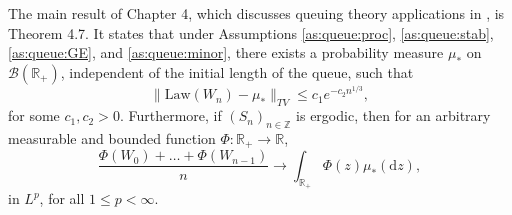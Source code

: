 \documentclass[a4paper,10pt]{article}
\newcommand{\Z}{\mathbb{Z}}
\newcommand{\R}{\mathbb{R}}
\newcommand{\law}[1]{\text{Law}(#1)}
\newcommand{\dint}{\mathrm{d}}  %
\begin{document}
\smallskip
The main result of Chapter 4, which discusses queuing theory applications in \cite{lovas}, is Theorem 4.7. It states that under Assumptions \ref{as:queue:proc}, \ref{as:queue:stab}, \ref{as:queue:GE}, and \ref{as:queue:minor}, there exists a probability measure $\mu_{*}$ on $\mathcal{B}(\R_{+})$, independent of the initial length of the queue, such that
\begin{equation}\label{eq:old_res}
	\lVert \law{W_n} - \mu_{*} \rVert_{TV} \leq c_1 e^{-c_2 n^{1/3}},
\end{equation}
for some $c_1, c_2 > 0$. Furthermore, if $\left(S_n\right)_{n\in\Z}$ is ergodic, then for an arbitrary measurable and bounded function $\Phi: \R_{+} \to \R$,
\begin{equation}\label{torta2}
	\frac{\Phi(W_0) + \ldots + \Phi(W_{n-1})}{n} \to \int_{\R_{+}} \Phi(z) \mu_{*}(\dint z),
\end{equation}
in $L^p$, for all $1 \le p < \infty$. 
\end{document}
